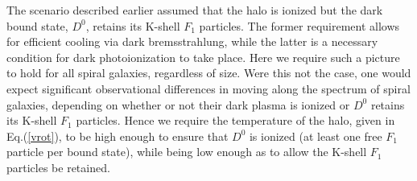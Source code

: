 \documentclass[12pt]{article}
\begin{document}
{{The scenario described earlier assumed that the halo is ionized but the dark bound state, $D ^0$, retains its K-shell $F_1$ particles. The former requirement allows for efficient cooling via dark bremsstrahlung, while the latter is a necessary condition for dark photoionization to take place. Here we require such a picture to hold for all spiral galaxies, regardless of size. Were this not the case, one would expect significant observational differences in moving along the spectrum of spiral galaxies, depending on whether or not their dark plasma is ionized or $D ^0$ retains its K-shell $F_1$ particles. Hence we require the temperature of the halo, given in Eq.(\ref{vrot}), to be high enough to ensure that $D ^0 $ is ionized (at least one free $F_1$ particle per bound state), while being low enough as to allow the K-shell $F_1$ particles be retained. 

}}
\end{document}
